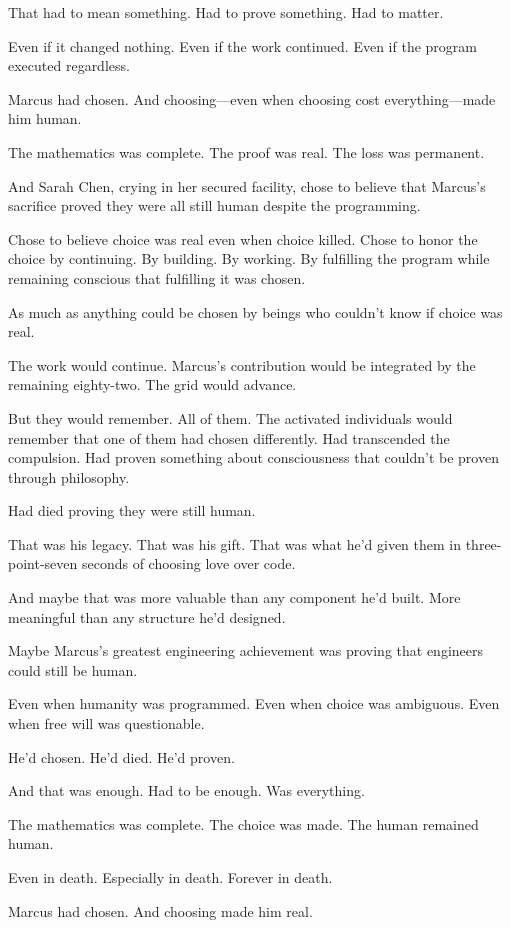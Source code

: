 That had to mean something. Had to prove something. Had to matter.

Even if it changed nothing. Even if the work continued. Even if the program executed regardless.

Marcus had chosen. And choosing—even when choosing cost everything—made him human.

The mathematics was complete. The proof was real. The loss was permanent.

And Sarah Chen, crying in her secured facility, chose to believe that Marcus's sacrifice proved they were all still human despite the programming.

Chose to believe choice was real even when choice killed. Chose to honor the choice by continuing. By building. By working. By fulfilling the program while remaining conscious that fulfilling it was chosen.

As much as anything could be chosen by beings who couldn't know if choice was real.

The work would continue. Marcus's contribution would be integrated by the remaining eighty-two. The grid would advance.

But they would remember. All of them. The activated individuals would remember that one of them had chosen differently. Had transcended the compulsion. Had proven something about consciousness that couldn't be proven through philosophy.

Had died proving they were still human.

That was his legacy. That was his gift. That was what he'd given them in three-point-seven seconds of choosing love over code.

And maybe that was more valuable than any component he'd built. More meaningful than any structure he'd designed.

Maybe Marcus's greatest engineering achievement was proving that engineers could still be human.

Even when humanity was programmed. Even when choice was ambiguous. Even when free will was questionable.

He'd chosen. He'd died. He'd proven.

And that was enough. Had to be enough. Was everything.

The mathematics was complete. The choice was made. The human remained human.

Even in death. Especially in death. Forever in death.

Marcus had chosen. And choosing made him real.

